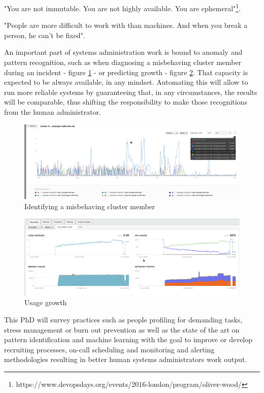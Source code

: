 \documentclass{llncs}
\begin{document}
"You are not immutable. You are not highly available. You are ephemeral"\footnote{https://www.devopsdays.org/events/2016-london/program/oliver-wood/}.

"People are more difficult to work with than machines. And when you break a person, he can't be fixed".\cite{ric:rio}

An important part of systems administration work is bound to anomaly and pattern recognition, such as when diagnosing a misbehaving cluster member during an incident - figure \ref{fig:Screenshot_20170304_155530.png} - or predicting growth - figure \ref{fig:Screenshot_20170307_134821.png}. That capacity is expected to be always available, in any mindset. Automating this will allow to run more reliable systems by guaranteeing that, in any circumstances, the results will be comparable, thus shifting the responsibility to make those recognitions from the human administrator.

\begin{figure}
\includegraphics[width=\linewidth]{images/Screenshot_20170304_155530.png}
\caption{Identifying a misbehaving cluster member}
\label{fig:Screenshot_20170304_155530.png}
\end{figure}

\begin{figure}
\includegraphics[width=\linewidth]{images/Screenshot_20170307_134821.png}
\caption{Usage growth}
\label{fig:Screenshot_20170307_134821.png}
\end{figure}

This PhD will survey practices such as people profiling for demanding tasks, stress management or burn out prevention as well as the state of the art on pattern identification and machine learning  with the goal to improve or develop recruiting processes, on-call scheduling and monitoring and alerting methodologies resulting in better human systems administrators work output.
%
\end{document}
